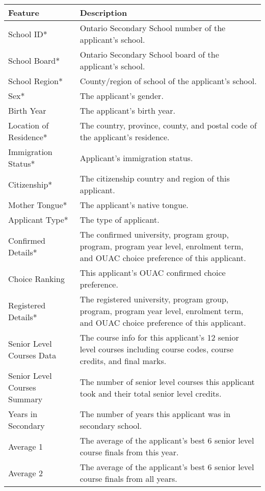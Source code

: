 \documentclass[titlepage]{article}
\begin{document}
\begin{table}[!hb]
\begin{center}
\begin{tabular}{| C{4cm} | C{10cm} |}\hline
	\textbf{Feature}				&\textbf{Description}\\\hline
	School ID*						&Ontario Secondary School number of the applicant's school.\\\hline
	School Board*					&Ontario Secondary School board of the applicant's school.\\\hline
	School Region*					&County/region of school of the applicant's school.\\\hline
	Sex*							&The applicant's gender.\\\hline
	Birth Year						&The applicant's birth year.\\\hline
	Location of Residence*			&The country, province, county, and postal code of the applicant's residence.\\\hline
	Immigration Status*				&Applicant's immigration status.\\\hline
	Citizenship*					&The citizenship country and region of this applicant.\\\hline
	Mother Tongue*					&The applicant's native tongue.\\\hline
	Applicant Type*					&The type of applicant.\\\hline
	Confirmed Details*				&The confirmed university, program group, program, program year level, enrolment term, and OUAC choice preference of this applicant.\\\hline
	Choice Ranking					&This applicant's OUAC confirmed choice preference.\\\hline
	Registered Details*				&The registered university, program group, program, program year level, enrolment term, and OUAC choice preference of this applicant.\\\hline
	Senior Level Courses Data		&The course info for this applicant's 12 senior level courses including course codes, course credits, and final marks.\\\hline
	Senior Level Courses Summary	&The number of senior level courses this applicant took and their total senior level credits.\\\hline
	Years in Secondary				&The number of years this applicant was in secondary school.\\\hline
	Average 1						&The average of the applicant's best 6 senior level course finals from this year.\\\hline
	Average 2						&The average of the applicant's best 6 senior level course finals from all years.\\\hline

\end{tabular}
\end{center}
\end{table}
\end{document}
